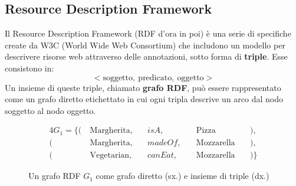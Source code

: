 \subsection[Resource Description Framework]{Resource Description Framework}
Il Resource Description Framework \cite{RDFspecification} (RDF d'ora in poi) è una serie di specifiche create da W3C (World Wide Web Consortium) che includono un modello per descrivere risorse web attraverso delle annotazioni, sotto forma di \textbf{triple}. Esse consistono in:
\[ < \text{soggetto},\ \text{predicato},\ \text{oggetto} > \]
Un insieme di queste triple, chiamato \textbf{grafo RDF}, può essere rappresentato come un grafo diretto etichettato in cui ogni tripla descrive un arco dal nodo soggetto al nodo oggetto.
\begin{figure}[h]
    \begin{minipage}{0.3\linewidth}
        \centering
    \end{minipage}
    \hspace{5mm}
    \begin{minipage}{0.7\linewidth}
        \begin{alignat*}{4}
            G_1 = \{ (\  & \text{Margherita},\  &  & isA,      &  & \text{Pizza}        &  & ),  \\
            (\           & \text{Margherita},\  &  & madeOf,\  &  & \text{Mozzarella}\  &  & ),  \\
            (\           & \text{Vegetarian},\  &  & canEat,\  &  & \text{Mozzarella}\  &  & )\}
        \end{alignat*}
    \end{minipage}
    \caption{Un grafo RDF $G_1$ come grafo diretto (sx.) e insieme di triple (dx.)}
    \label{fig:grafoRDF}
\end{figure}

